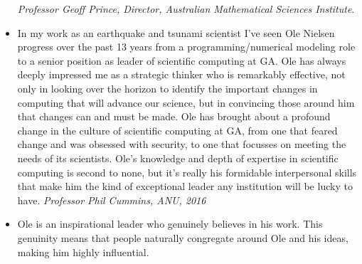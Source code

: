 \documentclass[11pt,a4paper]{article}
\begin{document}
\begin{itemize}
  \emph{Professor Geoff Prince, Director, Australian Mathematical Sciences Institute}.
\item In my work as an earthquake and tsunami scientist I've seen Ole Nielsen progress over the past 13 years from a programming/numerical modeling role to a senior position as leader of scientific computing at GA. Ole has always deeply impressed me as a strategic thinker who is remarkably effective, not only in looking over the horizon to identify the important changes in computing that will advance our science, but in convincing those around him that changes can and must be made. Ole has brought about a profound change in the culture of scientific computing at GA, from one that feared change and was obsessed with security, to one that focusses on meeting the needs of its scientists. Ole's knowledge and depth of expertise in scientific computing is second to none, but it's really his formidable interpersonal skills that make him the kind of exceptional leader any institution will be lucky to have.
  \emph{Professor Phil Cummins, ANU, 2016}
  
\item  Ole is an inspirational leader who genuinely believes in his work. This genuinity means that people naturally congregate around Ole and his ideas, making him highly influential.


\end{itemize}
\end{document}

